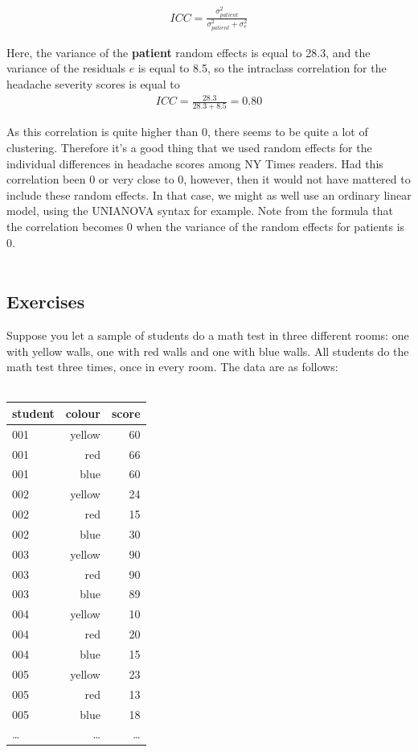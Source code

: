 \documentclass[]{book}\usepackage[]{graphicx}\usepackage[]{color}
\begin{document}
\begin{eqnarray}
ICC = \frac{\sigma^2_{patient} } {\sigma^2_{patient} +\sigma^2_e }   
\end{eqnarray}

Here, the variance of the \textbf{patient} random effects is equal to 28.3, and the variance of the residuals $e$ is equal to 8.5, so the intraclass correlation for the headache severity scores is equal to 
\begin{eqnarray}
ICC = \frac{28.3} {28.3 + 8.5 } =  0.80
\end{eqnarray}

As this correlation is quite higher than 0, there seems to be quite a lot of clustering. Therefore it's a good thing that we used random effects for the individual differences in headache scores among NY Times readers. Had this correlation been 0 or very close to 0, however, then it would not have mattered to include these random effects. In that case, we might as well use an ordinary linear model, using the UNIANOVA syntax for example. Note from the formula that the correlation becomes 0 when the variance of the random effects for patients is 0.
\\
\\


\subsection{Exercises}

Suppose you let a sample of students do a math test in three different rooms: one with yellow walls, one with red walls and one with blue walls. All students do the math test three times, once in every room. The data are as follows:
\\
 \\
 \begin{tabular}{lrr}
 student & colour & score \\ \hline
 001 & yellow & 60 \\
 001 & red & 66 \\
 001 & blue & 60 \\
 002 & yellow & 24 \\
 002 & red & 15 \\
 002 & blue & 30 \\
 003 & yellow & 90 \\
 003 & red & 90 \\
 003 & blue & 89 \\
 004 & yellow & 10 \\
 004 & red & 20 \\
 004 & blue & 15 \\
 005 & yellow & 23 \\
 005 & red & 13 \\
 005 & blue & 18 \\
 \dots & \dots & \dots \\
 \end{tabular}
\\
\\
\end{document}
